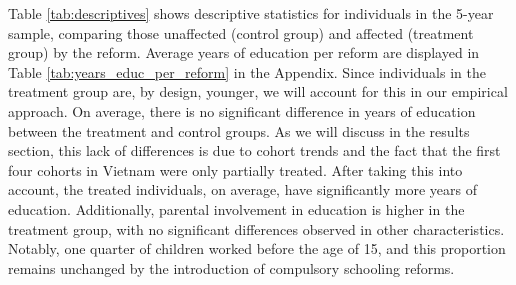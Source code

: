 Table \ref{tab:descriptives} shows descriptive statistics for individuals in the 5-year sample, comparing those unaffected (control group) and affected (treatment group) by the reform. Average years of education per reform are displayed in Table \ref{tab:years_educ_per_reform} in the Appendix. Since individuals in the treatment group are, by design, younger, we will account for this in our empirical approach. On average, there is no significant difference in years of education between the treatment and control groups. As we will discuss in the results section, this lack of differences is due to cohort trends and the fact that the first four cohorts in Vietnam were only partially treated. After taking this into account, the treated individuals, on average, have significantly more years of education. Additionally, parental involvement in education is higher in the treatment group, with no significant differences observed in other characteristics. Notably, one quarter of children worked before the age of 15, and this proportion remains unchanged by the introduction of compulsory schooling reforms.
